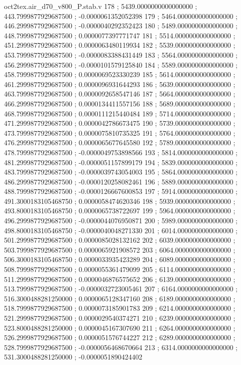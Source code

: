 \begin{filecontents}[overwrite]{oct2tex.air_d70_v800_P.stab.v}
178 ; 5439.0000000000000000 ; 443.7999877929687500 ; -0.0000061352052398
179 ; 5464.0000000000000000 ; 446.2999877929687500 ; -0.0000040292352423
180 ; 5489.0000000000000000 ; 448.7999877929687500 ; 0.0000077397771747
181 ; 5514.0000000000000000 ; 451.2999877929687500 ; 0.0000063480119934
182 ; 5539.0000000000000000 ; 453.7999877929687500 ; -0.0000083388431449
183 ; 5564.0000000000000000 ; 456.2999877929687500 ; -0.0000101579125840
184 ; 5589.0000000000000000 ; 458.7999877929687500 ; 0.0000069523330239
185 ; 5614.0000000000000000 ; 461.2999877929687500 ; 0.0000096931644293
186 ; 5639.0000000000000000 ; 463.7999877929687500 ; 0.0000092658547146
187 ; 5664.0000000000000000 ; 466.2999877929687500 ; 0.0000134411557156
188 ; 5689.0000000000000000 ; 468.7999877929687500 ; 0.0000111215440484
189 ; 5714.0000000000000000 ; 471.2999877929687500 ; 0.0000042786673475
190 ; 5739.0000000000000000 ; 473.7999877929687500 ; 0.0000075810735325
191 ; 5764.0000000000000000 ; 476.2999877929687500 ; 0.0000065677645580
192 ; 5789.0000000000000000 ; 478.7999877929687500 ; -0.0000049753898566
193 ; 5814.0000000000000000 ; 481.2999877929687500 ; -0.0000051157899179
194 ; 5839.0000000000000000 ; 483.7999877929687500 ; -0.0000039743054003
195 ; 5864.0000000000000000 ; 486.2999877929687500 ; -0.0000120258082461
196 ; 5889.0000000000000000 ; 488.7999877929687500 ; -0.0000126667600853
197 ; 5914.0000000000000000 ; 491.3000183105468750 ; 0.0000058474620346
198 ; 5939.0000000000000000 ; 493.8000183105468750 ; 0.0000065738722697
199 ; 5964.0000000000000000 ; 496.2999877929687500 ; -0.0000044076950871
200 ; 5989.0000000000000000 ; 498.8000183105468750 ; -0.0000040048271330
201 ; 6014.0000000000000000 ; 501.2999877929687500 ; 0.0000085028132162
202 ; 6039.0000000000000000 ; 503.7999877929687500 ; 0.0000065921908572
203 ; 6064.0000000000000000 ; 506.3000183105468750 ; 0.0000033935423289
204 ; 6089.0000000000000000 ; 508.7999877929687500 ; 0.0000055361479099
205 ; 6114.0000000000000000 ; 511.2999877929687500 ; 0.0000046876575652
206 ; 6139.0000000000000000 ; 513.7999877929687500 ; -0.0000032723005461
207 ; 6164.0000000000000000 ; 516.3000488281250000 ; 0.0000065128347160
208 ; 6189.0000000000000000 ; 518.7999877929687500 ; 0.0000073185901783
209 ; 6214.0000000000000000 ; 521.2999877929687500 ; 0.0000029540374271
210 ; 6239.0000000000000000 ; 523.8000488281250000 ; 0.0000045167307690
211 ; 6264.0000000000000000 ; 526.2999877929687500 ; 0.0000051576744227
212 ; 6289.0000000000000000 ; 528.7999877929687500 ; -0.0000056468670664
213 ; 6314.0000000000000000 ; 531.3000488281250000 ; -0.0000051890424402

\end{filecontents}

